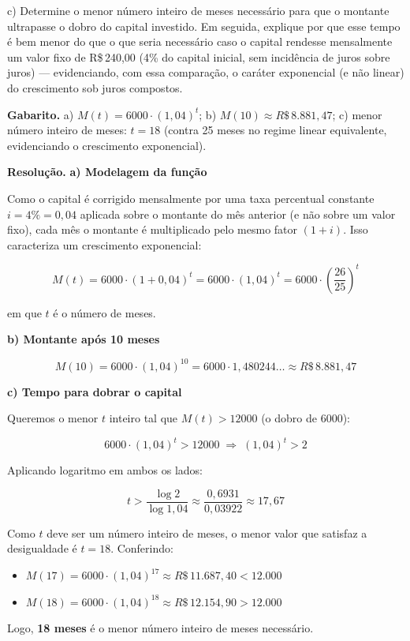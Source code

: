 \documentclass[11pt,a4paper]{article}
\begin{document}
c) Determine o menor número inteiro de meses necessário para que o montante ultrapasse o dobro do capital investido. Em seguida, explique por que esse tempo é bem menor do que o que seria necessário caso o capital rendesse mensalmente um valor fixo de R\$\,240,00 (4\% do capital inicial, sem incidência de juros sobre juros) — evidenciando, com essa comparação, o caráter exponencial (e não linear) do crescimento sob juros compostos.

\textbf{Gabarito.} a) $M(t) = 6000\cdot(1,04)^t$; b) $M(10) \approx R\$\,8.881{,}47$; c) menor número inteiro de meses: $t = 18$ (contra 25 meses no regime linear equivalente, evidenciando o crescimento exponencial).

\textbf{Resolução.} \textbf{a) Modelagem da função}

Como o capital é corrigido mensalmente por uma taxa percentual constante $i = 4\% = 0,04$ aplicada sobre o montante do mês anterior (e não sobre um valor fixo), cada mês o montante é multiplicado pelo mesmo fator $(1+i)$. Isso caracteriza um crescimento exponencial:

$$M(t) = 6000\cdot(1+0,04)^t = 6000\cdot(1,04)^t = 6000\cdot\left(\dfrac{26}{25}\right)^t$$

em que $t$ é o número de meses.

\textbf{b) Montante após 10 meses}

$$M(10) = 6000\cdot(1,04)^{10} = 6000\cdot 1{,}480244\ldots \approx R\$\,8.881{,}47$$

\textbf{c) Tempo para dobrar o capital}

Queremos o menor $t$ inteiro tal que $M(t) > 12000$ (o dobro de 6000):

$$6000\cdot(1,04)^t > 12000 \;\Rightarrow\; (1,04)^t > 2$$

Aplicando logaritmo em ambos os lados:

$$t > \dfrac{\log 2}{\log 1,04} \approx \dfrac{0,6931}{0,03922} \approx 17,67$$

Como $t$ deve ser um número inteiro de meses, o menor valor que satisfaz a desigualdade é $t = 18$. Conferindo:

\begin{itemize}[nosep,leftmargin=*]
\item $M(17) = 6000\cdot(1,04)^{17} \approx R\$\,11.687{,}40 < 12.000$
\item $M(18) = 6000\cdot(1,04)^{18} \approx R\$\,12.154{,}90 > 12.000$
\end{itemize}

Logo, \textbf{18 meses} é o menor número inteiro de meses necessário.
\end{document}
